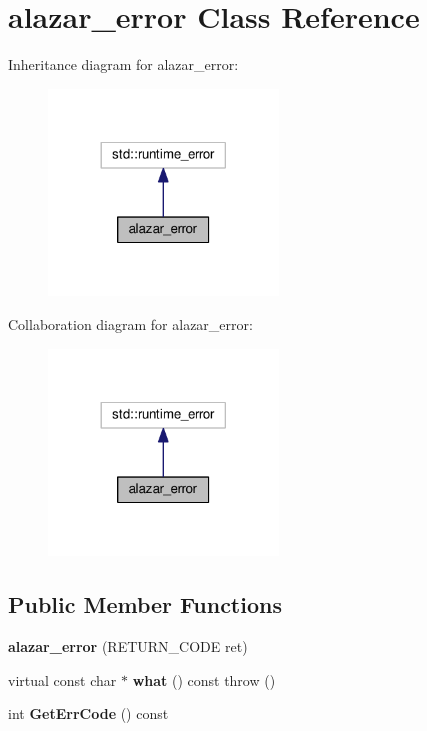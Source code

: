 \hypertarget{classalazar__error}{}\section{alazar\+\_\+error Class Reference}
\label{classalazar__error}


Inheritance diagram for alazar\+\_\+error\+:
\nopagebreak
\begin{figure}[H]
\begin{center}
\leavevmode
\includegraphics[width=173pt]{classalazar__error__inherit__graph}
\end{center}
\end{figure}


Collaboration diagram for alazar\+\_\+error\+:
\nopagebreak
\begin{figure}[H]
\begin{center}
\leavevmode
\includegraphics[width=173pt]{classalazar__error__coll__graph}
\end{center}
\end{figure}
\subsection*{Public Member Functions}
\begin{DoxyCompactItemize}
\item 
{\bfseries alazar\+\_\+error} (R\+E\+T\+U\+R\+N\+\_\+\+C\+O\+DE ret)\hypertarget{classalazar__error_a762da54dc850295e0d06cbcd4ca0c02c}{}\label{classalazar__error_a762da54dc850295e0d06cbcd4ca0c02c}

\item 
virtual const char $\ast$ {\bfseries what} () const   throw ()\hypertarget{classalazar__error_a4aea33558f69d777c9d383c844021ddd}{}\label{classalazar__error_a4aea33558f69d777c9d383c844021ddd}

\item 
int {\bfseries Get\+Err\+Code} () const \hypertarget{classalazar__error_ac759f6b1f2eeb82daa2861ec10b875ad}{}\label{classalazar__error_ac759f6b1f2eeb82daa2861ec10b875ad}

\end{DoxyCompactItemize}


